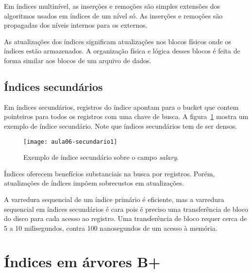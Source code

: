 Em índices multinível, as inserções e remoções são simples extensões dos
algoritmos usados em índices de um nível só.
As inserções e remoções são propagadas dos níveis internos para os externos.

As atualizações dos índices significam atualizações nos blocos físicos
onde os índices estão armazenados.
A organização física e lógica desses blocos é feita de forma similar
aos blocos de um arquivo de dados.

\subsection{Índices secundários}

Em índices secundários, registros do índice apontam para o bucket que contem pointeiros
para todos os registros com uma chave de busca.
A figura~\ref{aula06:fig:secundario} mostra um exemplo de índice secundário.
Note que índices secundários tem de ser densos.
%
\begin{figure}[!htb]
\centering
\texttt{[image: aula06-secundario1]}
\caption{Exemplo de índice secundário sobre o campo \emph{salary}.}
\label{aula06:fig:secundario}
\end{figure}

Índices oferecem benefícios substanciais na busca por registros.
Porém, atualizações de índices impõem sobrecustos em atualizações.

A varredura sequencial de um índice primário é eficiente, mas a 
varredura sequencial em índices secundários é cara pois é preciso
uma transferência de bloco do disco para cada acesso ao registro.
Uma transferência de bloco requer cerca de 5 a 10 milisegundos, contra
100 nanosegundos de um acesso à memória.


\section{Índices em árvores B+}

